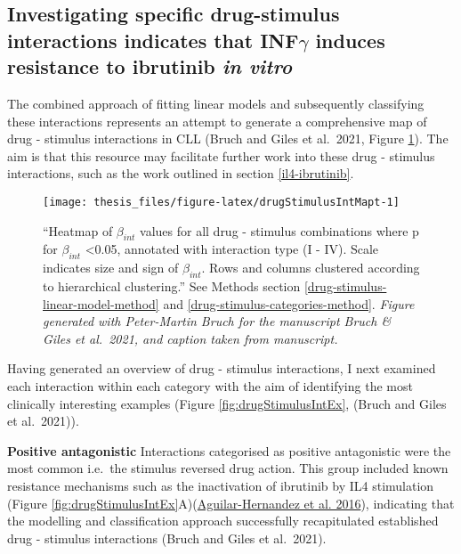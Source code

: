 \documentclass[11pt, a4paper, twosided]{book}
\begin{document}
\hypertarget{drug-stimulus-interaction-examples}{%
\subsection{\texorpdfstring{Investigating specific drug-stimulus interactions indicates that INF\(\gamma\) induces resistance to ibrutinib \emph{in vitro}}{Investigating specific drug-stimulus interactions indicates that INF\textbackslash gamma induces resistance to ibrutinib in vitro}}\label{drug-stimulus-interaction-examples}}

The combined approach of fitting linear models and subsequently classifying these interactions represents an attempt to generate a comprehensive map of drug - stimulus interactions in CLL (Bruch and Giles et al.~2021, Figure \ref{fig:drugStimulusIntMapt}). The aim is that this resource may facilitate further work into these drug - stimulus interactions, such as the work outlined in section \ref{il4-ibrutinib}.


\begin{figure}

{\centering \texttt{[image: thesis\_files/figure-latex/drugStimulusIntMapt-1]} 

}

\caption{``Heatmap of \(\beta_{int}\) values for all drug - stimulus combinations where p for \(\beta_{int}\) \textless0.05, annotated with interaction type (I - IV). Scale indicates size and sign of \(\beta_{int}\). Rows and columns clustered according to hierarchical clustering.'' See Methods section \ref{drug-stimulus-linear-model-method} and \ref{drug-stimulus-categories-method}. \emph{Figure generated with Peter-Martin Bruch for the manuscript Bruch \& Giles et al.~2021, and caption taken from manuscript.}}\label{fig:drugStimulusIntMapt}
\end{figure}
Having generated an overview of drug - stimulus interactions, I next examined each interaction within each category with the aim of identifying the most clinically interesting examples (Figure \ref{fig:drugStimulusIntEx}, (Bruch and Giles et al.~2021)).

\textbf{Positive antagonistic} Interactions categorised as positive antagonistic were the most common i.e.~the stimulus reversed drug action. This group included known resistance mechanisms such as the inactivation of ibrutinib by IL4 stimulation (Figure \ref{fig:drugStimulusIntEx}A)(\protect\hyperlink{ref-AguilarHernandez2016}{Aguilar-Hernandez et al. 2016}), indicating that the modelling and classification approach successfully recapitulated established drug - stimulus interactions (Bruch and Giles et al.~2021).
\end{document}
